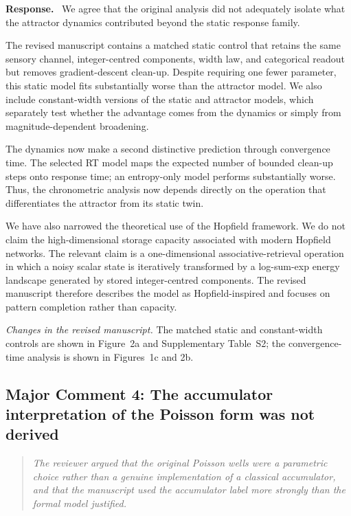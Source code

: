 \documentclass[11pt]{article}
\newenvironment{reviewercomment}{\begin{quote}\color{reviewgray}\itshape}{\end{quote}}
\newenvironment{authorresponse}{\par\noindent\textbf{\color{responseblue}Response.}\ }{\par}
\newcommand{\change}[1]{\par\noindent\textit{Changes in the revised manuscript.} #1\par}
\begin{document}
\begin{authorresponse}
We agree that the original analysis did not adequately isolate what the attractor dynamics contributed beyond the static response family.

The revised manuscript contains a matched static control that retains the same sensory channel, integer-centred components, width law, and categorical readout but removes gradient-descent clean-up. Despite requiring one fewer parameter, this static model fits substantially worse than the attractor model. We also include constant-width versions of the static and attractor models, which separately test whether the advantage comes from the dynamics or simply from magnitude-dependent broadening.

The dynamics now make a second distinctive prediction through convergence time. The selected RT model maps the expected number of bounded clean-up steps onto response time; an entropy-only model performs substantially worse. Thus, the chronometric analysis now depends directly on the operation that differentiates the attractor from its static twin.

We have also narrowed the theoretical use of the Hopfield framework. We do not claim the high-dimensional storage capacity associated with modern Hopfield networks. The relevant claim is a one-dimensional associative-retrieval operation in which a noisy scalar state is iteratively transformed by a log-sum-exp energy landscape generated by stored integer-centred components. The revised manuscript therefore describes the model as Hopfield-inspired and focuses on pattern completion rather than capacity.
\end{authorresponse}

\change{The matched static and constant-width controls are shown in Figure~2a and Supplementary Table~S2; the convergence-time analysis is shown in Figures~1c and 2b.}

\subsection*{Major Comment 4: The accumulator interpretation of the Poisson form was not derived}

\begin{reviewercomment}
The reviewer argued that the original Poisson wells were a parametric choice rather than a genuine implementation of a classical accumulator, and that the manuscript used the accumulator label more strongly than the formal model justified.
\end{reviewercomment}
\end{document}
